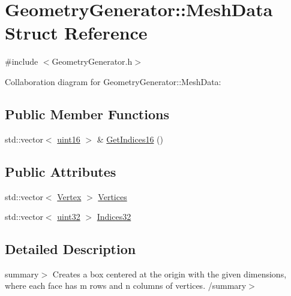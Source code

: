 \hypertarget{struct_geometry_generator_1_1_mesh_data}{}\section{Geometry\+Generator\+:\+:Mesh\+Data Struct Reference}
\label{struct_geometry_generator_1_1_mesh_data}


{\ttfamily \#include $<$Geometry\+Generator.\+h$>$}



Collaboration diagram for Geometry\+Generator\+:\+:Mesh\+Data\+:
\subsection*{Public Member Functions}
\begin{DoxyCompactItemize}
\item 
std\+::vector$<$ \hyperlink{class_geometry_generator_a2b566f68436d7cca7976e6d7e3bae53d_a2b566f68436d7cca7976e6d7e3bae53d}{uint16} $>$ \& \hyperlink{struct_geometry_generator_1_1_mesh_data_a14de3934f0b3c9be6c32627a16811196_a14de3934f0b3c9be6c32627a16811196}{Get\+Indices16} ()
\end{DoxyCompactItemize}
\subsection*{Public Attributes}
\begin{DoxyCompactItemize}
\item 
std\+::vector$<$ \hyperlink{struct_geometry_generator_1_1_vertex}{Vertex} $>$ \hyperlink{struct_geometry_generator_1_1_mesh_data_a2a85f97f9a84b4f68d71cdcd41a7198b_a2a85f97f9a84b4f68d71cdcd41a7198b}{Vertices}
\item 
std\+::vector$<$ \hyperlink{class_geometry_generator_a37fc6dd464913f90a718f59862a9beeb_a37fc6dd464913f90a718f59862a9beeb}{uint32} $>$ \hyperlink{struct_geometry_generator_1_1_mesh_data_af32ad2f27a3c6c78700f726050e2eb73_af32ad2f27a3c6c78700f726050e2eb73}{Indices32}
\end{DoxyCompactItemize}


\subsection{Detailed Description}
summary$>$ Creates a box centered at the origin with the given dimensions, where each face has m rows and n columns of vertices. /summary$>$ 

